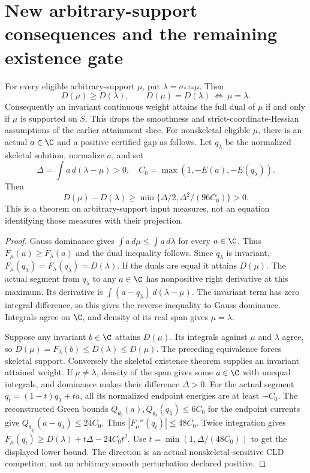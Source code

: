\section{New arbitrary-support consequences and the remaining existence gate}
\begin{theorem}\label{newrad:projection}
For every eligible arbitrary-support $\mu$, put
$\lambda=\sigma_*\tau_*\mu$. Then
\[
 D(\mu)\ge D(\lambda),\qquad
 D(\mu)=D(\lambda)\ \Longleftrightarrow\ \mu=\lambda.
\]
Consequently an invariant continuous weight attains the full dual of
$\mu$ if and only if $\mu$ is supported on $S$. This drops the
smoothness and strict-coordinate-Hessian assumptions of the earlier
attainment slice. For nonskeletal eligible $\mu$, there is an actual
$a\in\C$ and a positive certified gap as follows. Let $q_\lambda$
be the normalized skeletal solution, normalize $a$, and set
\[
 \Delta=\int a\,d(\lambda-\mu)>0,
 \quad C_0=\max(1,-E(a),-E(q_\lambda)).
\]
Then
\[
 D(\mu)-D(\lambda)\ge
 \min\{\Delta/2,\Delta^2/(96C_0)\}>0.
\]
This is a theorem on arbitrary-support input measures, not an equation
identifying those measures with their projection.
\end{theorem}
\begin{proof}
Gauss dominance gives $\int a\,d\mu\le\int a\,d\lambda$ for every
$a\in\C$. Thus $F_\mu(a)\ge F_\lambda(a)$ and the dual inequality
follows. Since $q_\lambda$ is invariant,
$F_\mu(q_\lambda)=F_\lambda(q_\lambda)=D(\lambda)$.
If the duals are equal it attains $D(\mu)$. The actual segment from
$q_\lambda$ to any $a\in\C$ has nonpositive right derivative at
this maximum. Its derivative is
$\int(a-q_\lambda)\,d(\lambda-\mu)$.
The invariant term has zero integral difference, so this gives the
reverse inequality to Gauss dominance. Integrals agree on $\C$,
and density of its real span gives $\mu=\lambda$.

Suppose any invariant $b\in\C$ attains $D(\mu)$. Its integrals
against $\mu$ and $\lambda$ agree, so
$D(\mu)=F_\lambda(b)\le D(\lambda)\le D(\mu)$.
The preceding equivalence forces skeletal support. Conversely the
skeletal existence theorem supplies an invariant attained weight.
If $\mu\ne\lambda$, density of the span gives some $a\in\C$ with
unequal integrals, and dominance makes their difference $\Delta>0$.
For the actual segment $q_t=(1-t)q_\lambda+ta$, all its normalized
endpoint energies are at least $-C_0$. The reconstructed Green bounds
$Q_{\theta_b}(a),Q_{\theta_b}(q_\lambda)\le6C_0$ for the endpoint
currents give $Q_{\theta_{q_t}}(a-q_\lambda)\le24C_0$.
Thus $|F_\mu''(q_t)|\le48C_0$. Twice integration gives
$F_\mu(q_t)\ge D(\lambda)+t\Delta-24C_0t^2$.
Use $t=\min(1,\Delta/(48C_0))$ to get the displayed lower bound.
The direction is an actual nonskeletal-sensitive CLD competitor, not
an arbitrary smooth perturbation declared positive.
\end{proof}

